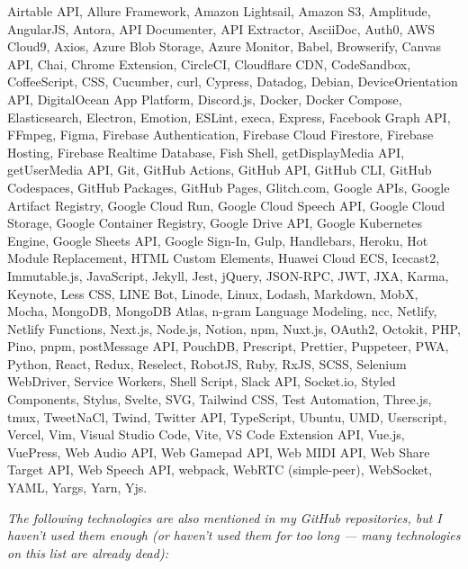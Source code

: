 \documentclass[a4paper]{article}
\begin{document}
\vspace{2mm}

Airtable API, Allure Framework, Amazon Lightsail, Amazon S3, Amplitude, AngularJS, Antora, API Documenter, API Extractor, AsciiDoc, Auth0, AWS Cloud9, Axios, Azure Blob Storage, Azure Monitor, Babel, Browserify, Canvas API, Chai, Chrome Extension, CircleCI, Cloudflare CDN, CodeSandbox, CoffeeScript, CSS, Cucumber, curl, Cypress, Datadog, Debian, DeviceOrientation API, DigitalOcean App Platform, Discord.js, Docker, Docker Compose, Elasticsearch, Electron, Emotion, ESLint, execa, Express, Facebook Graph API, FFmpeg, Figma, Firebase Authentication, Firebase Cloud Firestore, Firebase Hosting, Firebase Realtime Database, Fish Shell, getDisplayMedia API, getUserMedia API, Git, GitHub Actions, GitHub API, GitHub CLI, GitHub Codespaces, GitHub Packages, GitHub Pages, Glitch.com, Google APIs, Google Artifact Registry, Google Cloud Run, Google Cloud Speech API, Google Cloud Storage, Google Container Registry, Google Drive API, Google Kubernetes Engine, Google Sheets API, Google Sign-In, Gulp, Handlebars, Heroku, Hot Module Replacement, HTML Custom Elements, Huawei Cloud ECS, Icecast2, Immutable.js, JavaScript, Jekyll, Jest, jQuery, JSON-RPC, JWT, JXA, Karma, Keynote, Less CSS, LINE Bot, Linode, Linux, Lodash, Markdown, MobX, Mocha, MongoDB, MongoDB Atlas, n-gram Language Modeling, ncc, Netlify, Netlify Functions, Next.js, Node.js, Notion, npm, Nuxt.js, OAuth2, Octokit, PHP, Pino, pnpm, postMessage API, PouchDB, Prescript, Prettier, Puppeteer, PWA, Python, React, Redux, Reselect, RobotJS, Ruby, RxJS, SCSS, Selenium WebDriver, Service Workers, Shell Script, Slack API, Socket.io, Styled Components, Stylus, Svelte, SVG, Tailwind CSS, Test Automation, Three.js, tmux, TweetNaCl, Twind, Twitter API, TypeScript, Ubuntu, UMD, Userscript, Vercel, Vim, Visual Studio Code, Vite, VS Code Extension API, Vue.js, VuePress, Web Audio API, Web Gamepad API, Web MIDI API, Web Share Target API, Web Speech API, webpack, WebRTC (simple-peer), WebSocket, YAML, Yargs, Yarn, Yjs.

\vspace{2mm}


\textit{The following technologies are also mentioned in my GitHub repositories, but I haven’t used them enough (or haven’t used them for too long — many technologies on this list are already dead):}

\vspace{2mm}
\end{document}
